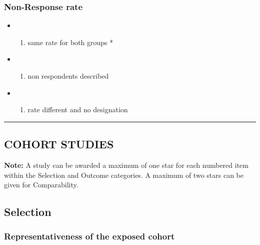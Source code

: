 \documentclass[
  doc, a4paper]{apa7}
\providecommand{\tightlist}{%
  \setlength{\itemsep}{0pt}\setlength{\parskip}{0pt}}
\begin{document}
\subsubsection{Non-Response rate}\label{non-response-rate}

\begin{itemize}
\tightlist
\item
  \begin{enumerate}
  \def\labelenumi{\alph{enumi})}
  \tightlist
  \item
    same rate for both groups *
  \end{enumerate}
\item
  \begin{enumerate}
  \def\labelenumi{\alph{enumi})}
  \setcounter{enumi}{1}
  \tightlist
  \item
    non respondents described
  \end{enumerate}
\item
  \begin{enumerate}
  \def\labelenumi{\alph{enumi})}
  \setcounter{enumi}{2}
  \tightlist
  \item
    rate different and no designation
  \end{enumerate}
\end{itemize}

\begin{center}\rule{0.5\linewidth}{0.5pt}\end{center}

\subsection{\texorpdfstring{\textbf{COHORT STUDIES}}{COHORT STUDIES}}\label{cohort-studies}

\textbf{Note:} A study can be awarded a maximum of one star for each numbered item within the Selection and Outcome categories. A maximum of two stars can be given for Comparability.

\subsection{Selection}\label{selection-1}

\subsubsection{Representativeness of the exposed cohort}\label{representativeness-of-the-exposed-cohort}
\end{document}
